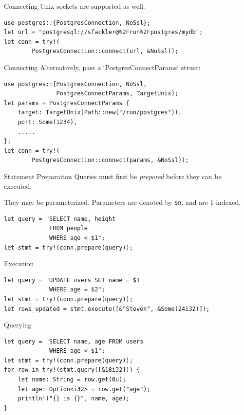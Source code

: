 \documentclass{beamer}
\begin{document}
\begin{frame}[fragile]{Connecting}
	Unix sockets are supported as well:
	\begin{verbatim}
use postgres::{PostgresConnection, NoSsl};
let url = "postgresql://sfackler@%2Frun%2Fpostgres/mydb";
let conn = try!(
        PostgresConnection::connect(url, &NoSsl));
	\end{verbatim}	
\end{frame}

\begin{frame}[fragile]{Connecting}
	Alternatively, pass a `PostgresConnectParams` struct:
	\begin{verbatim}
use postgres::{PostgresConnection, NoSsl,
               PostgresConnectParams, TargetUnix};
let params = PostgresConnectParams {
    target: TargetUnix(Path::new("/run/postgres")),
    port: Some(1234),
    .....
};
let conn = try!(
        PostgresConnection::connect(params, &NoSsl));
	\end{verbatim}
\end{frame}

\begin{frame}[fragile]{Statement Preparation}
    Queries must first be \emph{prepared} before they can be executed.

    They may be parameterized. Parameters are denoted by \verb!$n!, and are
    1-indexed.
    \begin{verbatim}
let query = "SELECT name, height
             FROM people
             WHERE age < $1";
let stmt = try!(conn.prepare(query));
    \end{verbatim}
\end{frame}

\begin{frame}[fragile]{Execution}
    \begin{verbatim}
let query = "UPDATE users SET name = $1
             WHERE age = $2";
let stmt = try!(conn.prepare(query));
let rows_updated = stmt.execute([&"Steven", &Some(24i32)]);
    \end{verbatim}
\end{frame}

\begin{frame}[fragile]{Querying}
    \begin{verbatim}
let query = "SELECT name, age FROM users
             WHERE age < $1";
let stmt = try!(conn.prepare(query));
for row in try!(stmt.query([&18i32])) {
    let name: String = row.get(0u);
    let age: Option<i32> = row.get("age");
    println!("{} is {}", name, age);
}
    \end{verbatim}
\end{frame}
\end{document}
